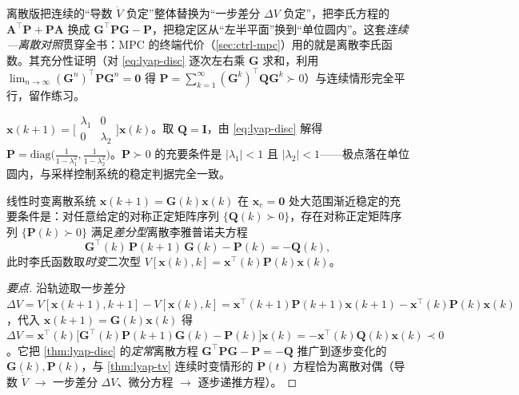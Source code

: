\begin{insight}
离散版把连续的“导数 $\dot V$ 负定”整体替换为“一步差分 $\Delta V$ 负定”，把李氏方程的 $\mathbf{A}^\top\mathbf{P}+\mathbf{P}\mathbf{A}$ 换成 $\mathbf{G}^\top\mathbf{P}\mathbf{G}-\mathbf{P}$，把稳定区从“左半平面”换到“单位圆内”。这套\emph{连续—离散对照}贯穿全书：MPC 的终端代价（\cref{sec:ctrl-mpc}）用的就是离散李氏函数。其充分性证明（对 \cref{eq:lyap-disc} 逐次左右乘 $\mathbf{G}$ 求和，利用 $\lim_{n\to\infty}(\mathbf{G}^{n})^\top\mathbf{P}\mathbf{G}^{n}=\mathbf{0}$ 得 $\mathbf{P}=\sum_{k=1}^\infty(\mathbf{G}^k)^\top\mathbf{Q}\mathbf{G}^k\succ0$）与连续情形完全平行，留作练习。
\end{insight}

\begin{example}\label{ex:lyap-disc-diag}
$\mathbf{x}(k+1)=\big[\begin{smallmatrix}\lambda_1&0\\0&\lambda_2\end{smallmatrix}\big]\mathbf{x}(k)$。取 $\mathbf{Q}=\mathbf{I}$，由 \cref{eq:lyap-disc} 解得 $\mathbf{P}=\mathrm{diag}\big(\tfrac{1}{1-\lambda_1^2},\tfrac{1}{1-\lambda_2^2}\big)$。$\mathbf{P}\succ0$ 的充要条件是 $|\lambda_1|<1$ 且 $|\lambda_2|<1$——极点落在单位圆内，与采样控制系统的稳定判据完全一致。
\end{example}

\begin{theorem}[线性时变离散系统渐近稳定判据]\label{thm:lyap-tv-disc}
线性时变离散系统 $\mathbf{x}(k+1)=\mathbf{G}(k)\mathbf{x}(k)$ 在 $\mathbf{x}_e=\mathbf{0}$ 处大范围渐近稳定的充要条件是：对任意给定的对称正定矩阵序列 $\{\mathbf{Q}(k)\succ0\}$，存在对称正定矩阵序列 $\{\mathbf{P}(k)\succ0\}$ 满足\emph{差分型}离散李雅普诺夫方程
\begin{equation}
  \mathbf{G}^\top(k)\,\mathbf{P}(k+1)\,\mathbf{G}(k)-\mathbf{P}(k)=-\mathbf{Q}(k),
  \label{eq:lyap-tv-disc}
\end{equation}
此时李氏函数取\emph{时变}二次型 $V[\mathbf{x}(k),k]=\mathbf{x}^\top(k)\mathbf{P}(k)\mathbf{x}(k)$。
\end{theorem}
\begin{proof}[要点]
沿轨迹取一步差分 $\Delta V=V[\mathbf{x}(k{+}1),k{+}1]-V[\mathbf{x}(k),k]=\mathbf{x}^\top(k{+}1)\mathbf{P}(k{+}1)\mathbf{x}(k{+}1)-\mathbf{x}^\top(k)\mathbf{P}(k)\mathbf{x}(k)$，代入 $\mathbf{x}(k{+}1)=\mathbf{G}(k)\mathbf{x}(k)$ 得 $\Delta V=\mathbf{x}^\top(k)\big[\mathbf{G}^\top(k)\mathbf{P}(k{+}1)\mathbf{G}(k)-\mathbf{P}(k)\big]\mathbf{x}(k)=-\mathbf{x}^\top(k)\mathbf{Q}(k)\mathbf{x}(k)\prec0$。它把 \cref{thm:lyap-disc} 的\emph{定常}离散方程 $\mathbf{G}^\top\mathbf{P}\mathbf{G}-\mathbf{P}=-\mathbf{Q}$ 推广到逐步变化的 $\mathbf{G}(k),\mathbf{P}(k)$，与 \cref{thm:lyap-tv} 连续时变情形的 $\dot{\mathbf{P}}(t)$ 方程恰为离散对偶（导数 $\dot V$ $\to$ 一步差分 $\Delta V$、微分方程 $\to$ 逐步递推方程）。
\end{proof}

